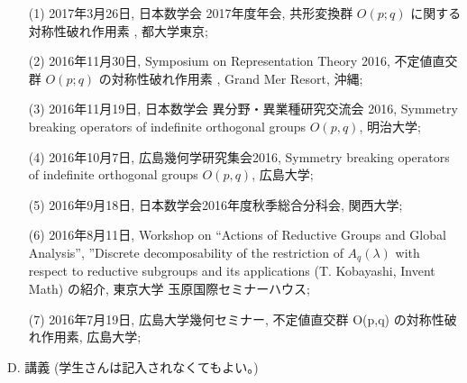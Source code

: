 \documentclass[a4j,twocolumn]{jarticle}
\begin{document}
\vspace{0.1cm}
\begin{enumerate}
	\item[(1)] 
2017年3月26日, 日本数学会 2017年度年会, 共形変換群 $O( p;q )$ に関する対称性破れ作用素 , 都大学東京;
	\item[(2)] 
2016年11月30日, Symposium on Representation Theory 2016, 不定値直交群 $O ( p; q )$ の対称性破れ作用素 , Grand Mer Resort, 沖縄;
	\item[(3)] 
2016年11月19日, 日本数学会 異分野・異業種研究交流会 2016, Symmetry breaking operators of indefinite orthogonal groups $O(p,q)$, 明治大学;
	\item[(4)] 
2016年10月7日, 広島幾何学研究集会2016, Symmetry breaking operators of indefinite orthogonal groups $O(p,q)$, 広島大学;
	\item[(5)] 
2016年9月18日, 日本数学会2016年度秋季総合分科会, 関西大学;
	\item[(6)] 
2016年8月11日, Workshop on “Actions of Reductive Groups and Global Analysis”, ”Discrete decomposability of the restriction of $A_q(\lambda)$ with respect to reductive subgroups and its applications (T. Kobayashi, Invent Math) の紹介, 東京大学 玉原国際セミナーハウス;
	\item[(7)] 
2016年7月19日, 広島大学幾何セミナー, 不定値直交群 O(p,q) の対称性破れ作用素, 広島大学;
\end{enumerate}

\vspace{0.2cm}
\noindent
D. 講義 (学生さんは記入されなくてもよい。)

\vspace{0.1cm}
\end{document}
